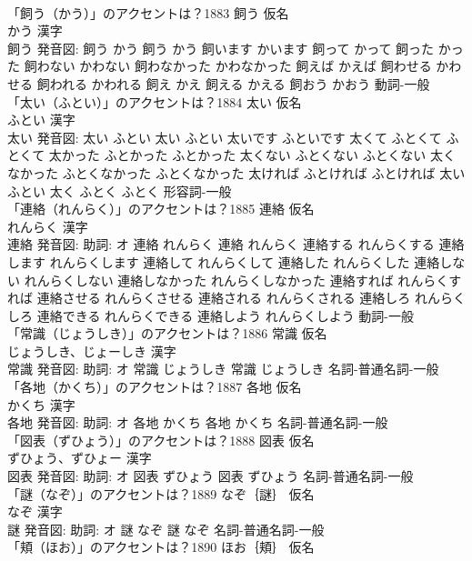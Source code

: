 \documentclass[8pt]{extreport}
\begin{document}
\begin{CJK}{UTF8}{min}
\\	「飼う（かう）」のアクセントは？1883	飼う 仮名　
\\	かう 漢字　
\\	飼う 発音図:	飼う かう		飼う かう 飼います かいます 飼って かって 飼った かった 飼わない かわない 飼わなかった かわなかった 飼えば かえば 飼わせる かわせる 飼われる かわれる 飼え かえ 飼える かえる 飼おう かおう				動詞-一般 
\\	「太い（ふとい）」のアクセントは？1884	太い 仮名　
\\	ふとい 漢字　
\\	太い 発音図:	太い ふとい		太い ふとい 太いです ふといです 太くて ふとくて ふとくて 太かった ふとかった ふとかった 太くない ふとくない ふとくない 太くなかった ふとくなかった ふとくなかった 太ければ ふとければ ふとければ 太い ふとい 太く ふとく ふとく				形容詞-一般 
\\	「連絡（れんらく）」のアクセントは？1885	連絡 仮名　
\\	れんらく 漢字　
\\	連絡 発音図: 助詞: オ	連絡 れんらく		連絡 れんらく 連絡する れんらくする 連絡します れんらくします 連絡して れんらくして 連絡した れんらくした 連絡しない れんらくしない 連絡しなかった れんらくしなかった 連絡すれば れんらくすれば 連絡させる れんらくさせる 連絡される れんらくされる 連絡しろ れんらくしろ 連絡できる れんらくできる 連絡しよう れんらくしよう				動詞-一般 
\\	「常識（じょうしき）」のアクセントは？1886	常識 仮名　
\\	じょうしき、じょーしき 漢字　
\\	常識 発音図: 助詞: オ	常識 じょうしき		常識 じょうしき				名詞-普通名詞-一般 
\\	「各地（かくち）」のアクセントは？1887	各地 仮名　
\\	かくち 漢字　
\\	各地 発音図: 助詞: オ	各地 かくち		各地 かくち				名詞-普通名詞-一般 
\\	「図表（ずひょう）」のアクセントは？1888	図表 仮名　
\\	ずひょう、ずひょー 漢字　
\\	図表 発音図: 助詞: オ	図表 ずひょう		図表 ずひょう				名詞-普通名詞-一般 
\\	「謎（なぞ）」のアクセントは？1889	なぞ｛謎｝ 仮名　
\\	なぞ 漢字　
\\	謎 発音図: 助詞: オ	謎 なぞ		謎 なぞ				名詞-普通名詞-一般 
\\	「頬（ほお）」のアクセントは？1890	ほお｛頬｝ 仮名　

\end{CJK}
\end{document}
